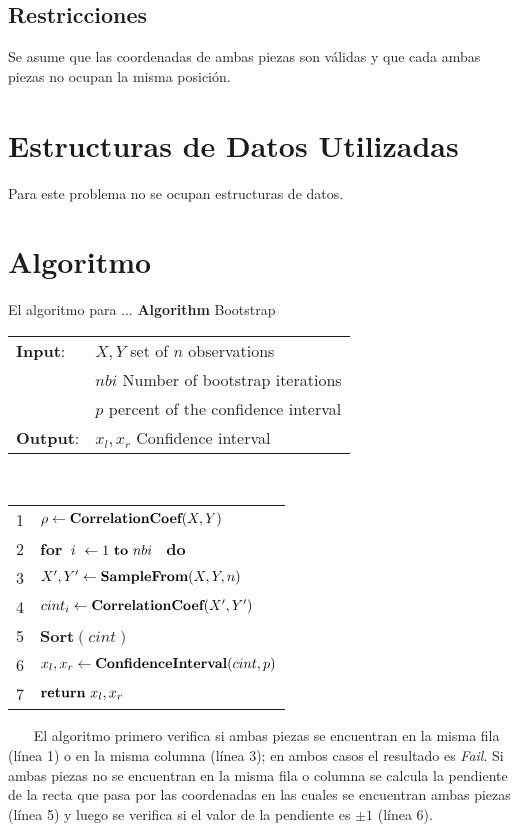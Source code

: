 \documentclass{report}
\newcommand \minitab{\hspace*{15 pt}}
\begin{document}
\subsection{Restricciones}
Se asume que las coordenadas de ambas piezas son v\'alidas y que cada ambas piezas no ocupan la misma posici\'on.
%
\section{Estructuras de Datos Utilizadas}
Para este problema no se ocupan estructuras de datos.
%
\section{Algoritmo}
El algoritmo para ...
\newline
\newline
{\bf Algorithm} Bootstrap
\newline
\newline
\begin{tabular}{l l}
{\bf Input}:  & $X, Y$ set of $n$ observations \\ 
              & $nbi$ Number of bootstrap iterations \\ 
              & $p$ percent of the confidence interval \\
{\bf Output}: & $x_l, x_r$ Confidence interval  \\
\end{tabular}
~~
\newline
\begin{tabular}{r l}
\\
1 & $\rho \leftarrow \mbox{\bf CorrelationCoef}(X,Y)$ \\
2 & {\bf for}~$i~\leftarrow 1~ \mbox{\bf to}~ nbi$~ {\bf do} \\
3 & \minitab $X',Y' \leftarrow \mbox{\bf SampleFrom}(X,Y,n)$ \\
4 & \minitab $cint_i \leftarrow \mbox{\bf CorrelationCoef}(X',Y')$ \\
5 & {\bf Sort}$(cint)$ \\
6 & $x_l,x_r \leftarrow \mbox{\bf ConfidenceInterval}(cint,p)$ \\
7 & $\mbox{\bf return}~x_l,x_r$
\end{tabular}
~~~
\newline
\newline
El algoritmo primero verifica si ambas piezas se encuentran en la misma fila (l\'inea 1) o en la misma columna
(l\'inea 3); en ambos casos el resultado es {\em Fail}. 
\newline
Si ambas piezas no se encuentran en la misma fila o columna se calcula la pendiente de la recta que pasa por las coordenadas
en las cuales se encuentran ambas piezas (l\'inea 5) y luego se verifica si el valor de la pendiente es $\pm 1$ 
(l\'inea 6).
%
\end{document}

